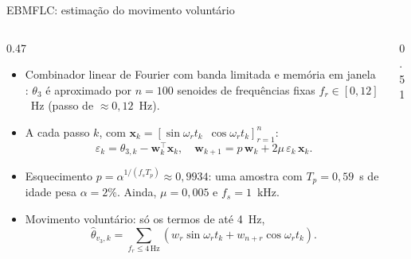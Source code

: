 
\begin{frame}{EBMFLC: estimação do movimento voluntário}
  \begin{columns}[T]
    \begin{column}{0.47\textwidth}
      \footnotesize
      \begin{itemize}
        \setlength{\itemsep}{0.12cm}
        \item Combinador linear de Fourier com banda limitada e memória em janela \cite{Atashzar:2016,Qi:2024}: $\theta_3$ é aproximado por $n = 100$ senoides de frequências fixas $f_r \in [0, 12]$~Hz (passo de $\approx 0{,}12$~Hz).
        \item A cada passo $k$, com $\mathbf{x}_k = [\sin\omega_r t_k \,\,\, \cos\omega_r t_k]_{r=1}^{n}$:
          \begin{equation*}
            \varepsilon_k = \theta_{3,k} - \mathbf{w}_k^\top\mathbf{x}_k,
            \quad
            \mathbf{w}_{k+1} = p\,\mathbf{w}_k + 2\mu\,\varepsilon_k\,\mathbf{x}_k.
          \end{equation*}
        \item Esquecimento $p = \alpha^{1/(f_s T_p)} \approx 0{,}9934$: uma amostra com $T_p = 0{,}59$~s de idade pesa $\alpha = 2\%$. Ainda, $\mu = 0{,}005$ e $f_s = 1$~kHz.
        \item Movimento voluntário: só os termos de até 4~Hz,
          \begin{equation*}
            \hat{\theta}_{v_3,k} = \textstyle\sum_{f_r \leq 4\,\text{Hz}} \left( w_{r}\sin\omega_r t_k + w_{n+r}\cos\omega_r t_k \right).
          \end{equation*}
      \end{itemize}
    \end{column}
    \begin{column}{0.51\textwidth}
      \centering
\end{column}
\end{columns}
\end{frame}
